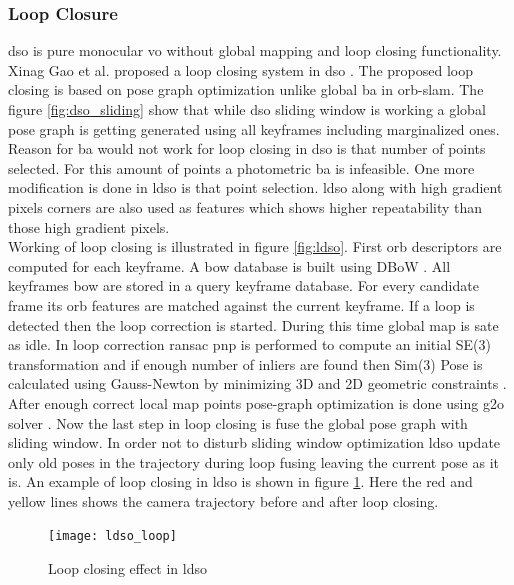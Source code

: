 \subsubsection{Loop Closure}
\acrshort{dso} is pure monocular \acrshort{vo} without global mapping and loop closing functionality. Xinag Gao et al. proposed a loop closing system in \acrshort{dso} \cite{gao2018ldso}. The proposed loop closing is based on pose graph optimization unlike global \acrshort{ba} in \acrshort{orb}-\acrshort{slam}. The figure \ref{fig:dso_sliding} show that while \acrshort{dso} sliding window is working a global pose graph is getting generated using all keyframes including marginalized ones. Reason for \acrshort{ba} would not work for loop closing in \acrshort{dso} is that number of points selected. For this amount of points a photometric \acrshort{ba} is infeasible. One more modification is done in \acrshort{ldso} is that point selection. \acrshort{ldso} along with high gradient pixels corners are also used as features which shows higher repeatability than those high gradient pixels.\\
\newline
Working of loop closing is illustrated in figure \ref{fig:ldso}. First \acrshort{orb} descriptors are computed for each keyframe. A \acrshort{bow} database is built using DBoW \cite{DboW}. All keyframes \acrshort{bow} are stored in a query keyframe database. For every candidate frame its \acrshort{orb} features are matched against the current keyframe. If a loop is detected then the loop correction is started. During this time global map is sate as idle. In loop correction \acrshort{ransac} \acrshort{pnp} is performed to compute an initial SE(3) transformation and if enough number of inliers are found then Sim(3) Pose is calculated using Gauss-Newton by minimizing 3D and 2D geometric constraints \cite{gao2018ldso}. After enough correct local map points pose-graph optimization is done using g2o solver \cite{g2o}. Now the last step in loop closing is fuse the global pose graph with sliding window. In order not to disturb sliding window optimization \acrshort{ldso} update only old poses in the trajectory during loop fusing leaving the current pose as it is. An example of loop closing in \acrshort{ldso} is shown in figure \ref{fig:ldso_loop}. Here the red and yellow lines shows the camera trajectory before and after loop closing. 
\begin{figure}[h!]
	\centering
	\texttt{[image: ldso\_loop]}
	\caption{Loop closing effect in ldso}
	\label{fig:ldso_loop}
\end{figure}

